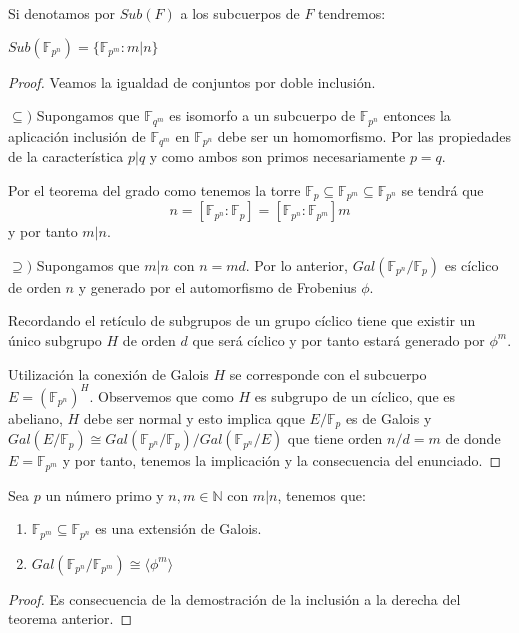 \begin{proposition}
	Si denotamos por $Sub(F)$ a los subcuerpos de $F$ tendremos:
	
	$Sub(\mathbb{F}_{p^n}) = \{\mathbb{F}_{p^m}:m|n\}$
\end{proposition}
\begin{proof}
	Veamos la igualdad de conjuntos por doble inclusión. 
	
	$\subseteq)$ Supongamos que $\mathbb{F}_{q^m}$ es isomorfo a un subcuerpo de $\mathbb{F}_{p^n}$ entonces la aplicación inclusión de $\mathbb{F}_{q^m}$ en $\mathbb{F}_{p^n}$ debe ser un homomorfismo. Por las propiedades de la característica $p|q$ y como ambos son primos necesariamente $p = q$. 
	
	Por el teorema del grado como tenemos la torre $\mathbb{F}_{p} \subseteq \mathbb{F}_{p^m} \subseteq \mathbb{F}_{p^n}$ se tendrá que $$n = [\mathbb{F}_{p^n}:\mathbb{F}_{p}] = [\mathbb{F}_{p^n}:\mathbb{F}_{p^m}]m$$ y por tanto $m|n$. 
	
	$\supseteq)$ Supongamos que $m|n$ con $n = md$. Por lo anterior, $Gal(\mathbb{F}_{p^n}/\mathbb{F}_p)$ es cíclico de orden $n$ y generado por el automorfismo de Frobenius $\phi$. 
	
	Recordando el retículo de subgrupos de un grupo cíclico tiene que existir un único subgrupo $H$ de orden $d$ que será cíclico  y por tanto estará generado por $\phi^m$. 
	
	Utilización la conexión de Galois $H$ se corresponde con el subcuerpo $E = (\mathbb{F}_{p^n})^H$. Observemos que como $H$ es subgrupo de un cíclico, que es abeliano, $H$ debe ser normal y esto implica qque $E/\mathbb{F}_p$ es de Galois y $Gal(E/\mathbb{F}_p) \cong Gal(\mathbb{F}_{p^n}/\mathbb{F}_p)/Gal(\mathbb{F}_{p^n}/E)$ que tiene orden $n/d = m$ de donde $E = \mathbb{F}_{p^m}$ y por tanto, tenemos la implicación y la consecuencia del enunciado. 
\end{proof}

\begin{corollary}
 Sea $p$ un número primo y $n,m \in \mathbb{N}$ con $m|n$, tenemos que:
 
 \begin{enumerate}
 \item $\mathbb{F}_{p^m} \subseteq \mathbb{F}_{p^n}$ es una extensión de Galois. 
 \item $Gal(\mathbb{F}_{p^n} /\mathbb{F}_{p^m}) \cong \langle \phi^m \rangle$
 \end{enumerate}
\end{corollary}
\begin{proof}
Es consecuencia de la demostración de la inclusión a la derecha del teorema anterior. 
\end{proof}


